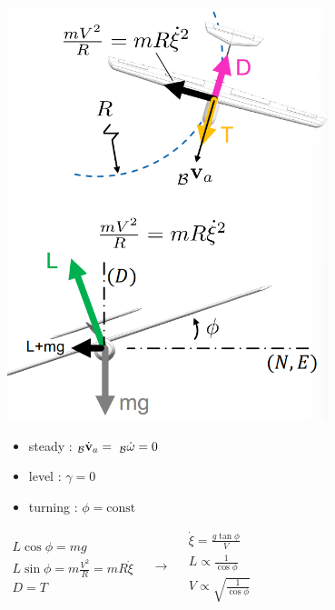 \documentclass[landscape,a0paper,fontscale=0.285]{baposter} %
\begin{document}
\begin{poster}
{\centering
\includegraphics[width=0.7\textwidth,trim={0cm 2cm 0cm 0cm},clip]{images/fixed_wing_turning.png}


\begin{itemize}
    \item steady : $_{\mathcal B}\dot{\textbf v}_a = ~_{\mathcal B}\dot{\omega}=0$
    \item level : $\gamma = 0$
    \item turning : $\phi = \text{const}$ 
\end{itemize}
$
\begin{array}{l}
L\cos\phi = mg \\
L\sin\phi = m\frac{V^2}{R} = mR\dot{\xi} \\
D = T
\end{array}
\quad \rightarrow \quad
\begin{array}{l}
\dot{\xi} = \frac{g\tan\phi}{V} \\
L \propto \frac{1}{\cos\phi} \\
V \propto \sqrt{\frac{1}{\cos\phi}}
\end{array}
$


\colorbox[HTML]{CCFFFF}{}

}
\end{poster}
\end{document}
